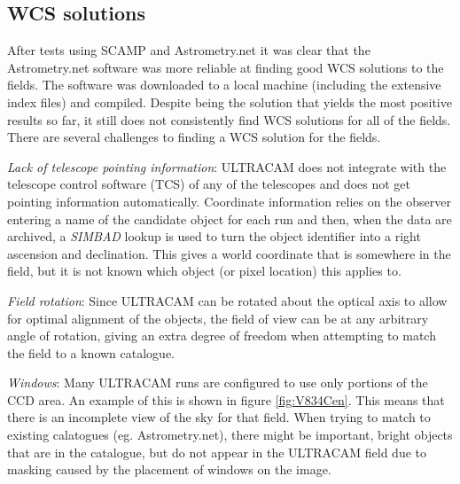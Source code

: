 


\subsection{WCS solutions}\label{sect:astrometry}

After tests using SCAMP \citep{scamp} and Astrometry.net \citep{astrometry} it was clear that the Astrometry.net software was more reliable at finding good WCS solutions to the fields. The software was downloaded to a local machine (including the extensive index files) and compiled. Despite being the solution that yields the most positive results so far, it still does not consistently find WCS solutions for all of the fields. There are several challenges to finding a WCS solution for the fields.

\emph{Lack of telescope pointing information}: ULTRACAM does not integrate with the telescope control software (TCS) of any of the telescopes and does not get pointing information automatically. Coordinate information relies on the observer entering a name of the candidate object for each run and then, when the data are archived, a \emph{SIMBAD} lookup is used to turn the object identifier into a right ascension and declination. This gives a world coordinate that is somewhere in the field, but it is not known which object (or pixel location) this applies to.  

\emph{Field rotation}: Since ULTRACAM can be rotated about the optical axis to allow for optimal alignment of the objects, the field of view can be at any arbitrary angle of rotation, giving an extra degree of freedom when attempting to match the field to a known catalogue. 

\emph{Windows}: Many ULTRACAM runs are configured to use only portions of the CCD area. An example of this is shown in figure \ref{fig:V834Cen}. This means that there is an incomplete view of the sky for that field. When trying to match to existing calatogues (eg. Astrometry.net), there might be important, bright objects that are in the catalogue, but do not appear in the ULTRACAM field due to masking caused by the placement of windows on the image.

